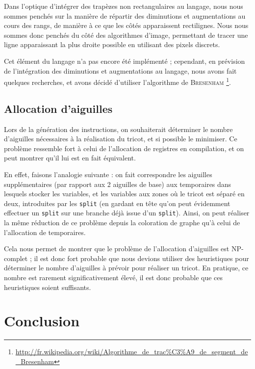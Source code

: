 \documentclass{article}
\begin{document}
Dans l'optique d'intégrer des trapèzes non rectangulaires au langage, nous nous sommes penchés sur la manière de répartir des 
diminutions et augmentations au cours des rangs, de manière à ce que les côtés apparaissent rectilignes.
Nous nous sommes donc penchés du côté des algorithmes d'image, permettant de tracer une ligne apparaissant la plus droite 
possible en utilisant des pixels discrets.

Cet élément du langage n'a pas encore été implémenté ; cependant, en prévision de l'intégration des diminutions et augmentations 
au langage, nous avons fait quelques recherches, et avons décidé d'utiliser l'algorithme de \textsc{Bresenham}
\footnote{\url{http://fr.wikipedia.org/wiki/Algorithme_de_trac\%C3\%A9_de_segment_de_Bresenham}}.

\subsection{Allocation d'aiguilles}

Lors de la génération des instructions, on souhaiterait déterminer le nombre d'aiguilles nécessaires à la réalisation du tricot, 
et si possible le minimiser. Ce problème ressemble fort à celui de l'allocation de registres en compilation, et on peut montrer 
qu'il lui est en fait équivalent.

En effet, faisons l'analogie suivante : on fait correspondre les aiguilles supplémentaires (par rapport aux 2 aiguilles de base) 
aux temporaires dans lesquels stocker les variables, et les variables aux zones où le tricot est séparé en deux, introduites par 
les \texttt{split} (en gardant en tête qu'on peut évidemment effectuer un \texttt{split} sur une branche déjà issue d'un 
\texttt{split}). Ainsi, on peut réaliser la même réduction de ce problème depuis la coloration de graphe qu'à celui de l'allocation 
de temporaires.

Cela nous permet de montrer que le problème de l'allocation d'aiguilles est \textsc{NP}-complet ; il est donc fort probable 
que nous devions utiliser des heuristiques pour déterminer le nombre d'aiguilles à prévoir pour réaliser un tricot. En pratique,
ce nombre est rarement significativement élevé, il est donc probable que ces heuristiques soient suffisants.

\section*{Conclusion}
\end{document}
